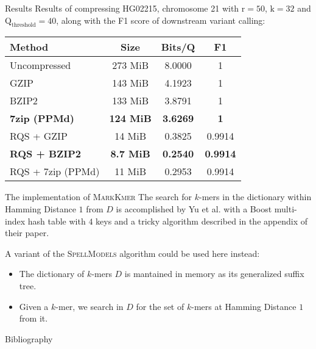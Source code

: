\documentclass[12pt]{beamer}
\begin{document}
    \begin{frame}{Results}
        Results of compressing HG02215, chromosome 21 with \(\text{r} = 50\),
        \(\text{k} = 32\) and \(\text{Q}_\text{threshold} = 40\), along with
        the F1 score of downstream variant calling:

        \vspace{0.25cm}

        \begin{table}
            \centering
            \begin{tabularx}{\linewidth}{Xccc}
                \hline
                Method & Size & Bits/Q & F1 \\
                \hline
                Uncompressed & 273 MiB & 8.0000 & 1 \\
                GZIP & 143 MiB & 4.1923 & 1 \\
                BZIP2 & 133 MiB & 3.8791 & 1 \\
                \textbf{7zip (PPMd)} & \textbf{124 MiB} & \textbf{3.6269} & \textbf{1} \\
                \hline
                RQS + GZIP & 14 MiB & 0.3825 & 0.9914 \\
                \textbf{RQS + BZIP2} & \textbf{8.7 MiB} & \textbf{0.2540} & \textbf{0.9914} \\
                RQS + 7zip (PPMd) & 11 MiB & 0.2953 & 0.9914\\
                \hline
            \end{tabularx}
        \end{table}
    \end{frame}

    \begin{frame}{The implementation of \textsc{MarkKmer}}
        The search for \(k\)-mers in the dictionary within Hamming Distance \(1\) from
        \(D\) is accomplished by Yu et al. with a Boost multi-index hash table with \(4\)
        keys and a tricky algorithm described in the appendix of their paper.

        \vspace{0.5cm}

        A variant of the \textsc{SpellModels} algorithm \cite{Sag98} could be used
        here instead:
        \begin{itemize}
            \item The dictionary of \(k\)-mers \(D\) is mantained in memory as its
                generalized suffix tree.
            \item Given a \(k\)-mer, we search in \(D\) for the set of \(k\)-mers
                at Hamming Distance \(1\) from it.
        \end{itemize}
    \end{frame}

    \begin{frame}[allowframebreaks]{Bibliography}
        
    \end{frame}
\end{document}

